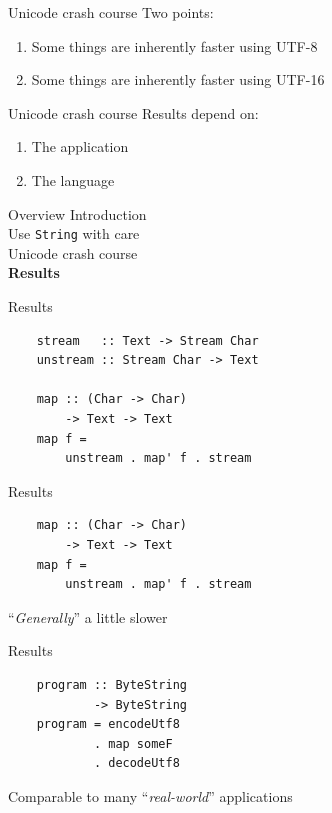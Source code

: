\documentclass[20pt]{beamer}
\newcommand{\vspaced}{
    \vspace{5mm}
}
\begin{document}
\begin{frame}{Unicode crash course}
    Two points:
    \begin{enumerate}
    \item Some things are inherently faster using UTF-8
    \item Some things are inherently faster using UTF-16
    \end{enumerate}
\end{frame}

\begin{frame}{Unicode crash course}
    Results depend on:
    \begin{enumerate}
    \item The application
    \item The language
    \end{enumerate}
\end{frame}


\begin{frame}{Overview}
    Introduction \\
    Use \texttt{String} with care \\
    Unicode crash course \\
    \textbf{Results} \\
\end{frame}

\begin{frame}[fragile]{Results}
    \begin{lstlisting}
    stream   :: Text -> Stream Char
    unstream :: Stream Char -> Text

    map :: (Char -> Char)
        -> Text -> Text
    map f =
        unstream . map' f . stream
    \end{lstlisting}
\end{frame}

\begin{frame}[fragile]{Results}
    \begin{lstlisting}
    map :: (Char -> Char)
        -> Text -> Text
    map f =
        unstream . map' f . stream
    \end{lstlisting}
    \vspaced
    ``\textit{Generally}'' a little slower
\end{frame}

\begin{frame}[fragile]{Results}
    \begin{lstlisting}
    program :: ByteString
            -> ByteString
    program = encodeUtf8
            . map someF
            . decodeUtf8
    \end{lstlisting}
    \vspaced
    Comparable to many ``\textit{real-world}'' applications
\end{frame}
\end{document}
